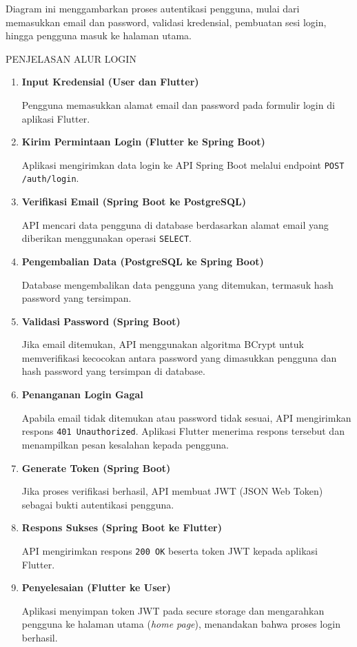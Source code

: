 \documentclass[11pt]{article}
\begin{document}
Diagram ini menggambarkan proses autentikasi pengguna, mulai dari memasukkan email dan password, validasi kredensial, pembuatan sesi login, hingga pengguna masuk ke halaman utama.

PENJELASAN ALUR LOGIN

\begin{enumerate}

\item \textbf{Input Kredensial (User dan Flutter)}

Pengguna memasukkan alamat email dan password pada formulir login di aplikasi Flutter.

\item \textbf{Kirim Permintaan Login (Flutter ke Spring Boot)}

Aplikasi mengirimkan data login ke API Spring Boot melalui endpoint \texttt{POST /auth/login}.

\item \textbf{Verifikasi Email (Spring Boot ke PostgreSQL)}

API mencari data pengguna di database berdasarkan alamat email yang diberikan menggunakan operasi \texttt{SELECT}.

\item \textbf{Pengembalian Data (PostgreSQL ke Spring Boot)}

Database mengembalikan data pengguna yang ditemukan, termasuk hash password yang tersimpan.

\item \textbf{Validasi Password (Spring Boot)}

Jika email ditemukan, API menggunakan algoritma BCrypt untuk memverifikasi kecocokan antara password yang dimasukkan pengguna dan hash password yang tersimpan di database.

\item \textbf{Penanganan Login Gagal}

Apabila email tidak ditemukan atau password tidak sesuai, API mengirimkan respons \texttt{401 Unauthorized}. Aplikasi Flutter menerima respons tersebut dan menampilkan pesan kesalahan kepada pengguna.

\item \textbf{Generate Token (Spring Boot)}

Jika proses verifikasi berhasil, API membuat JWT (JSON Web Token) sebagai bukti autentikasi pengguna.

\item \textbf{Respons Sukses (Spring Boot ke Flutter)}

API mengirimkan respons \texttt{200 OK} beserta token JWT kepada aplikasi Flutter.

\item \textbf{Penyelesaian (Flutter ke User)}

Aplikasi menyimpan token JWT pada secure storage dan mengarahkan pengguna ke halaman utama (\textit{home page}), menandakan bahwa proses login berhasil.

\end{enumerate}
\end{document}
